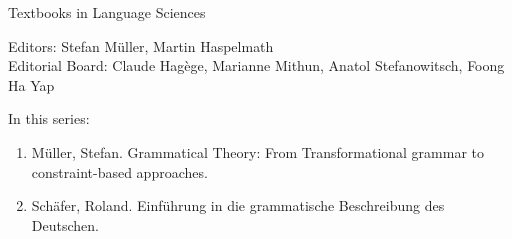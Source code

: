 {\large Textbooks in Language Sciences}

\bigskip

Editors: Stefan Müller, Martin Haspelmath  \\
Editorial Board: Claude Hagège, Marianne Mithun, Anatol Stefanowitsch, Foong Ha Yap

\bigskip

In this series:

\begin{enumerate}
\item Müller, Stefan. Grammatical Theory: From Transformational grammar to constraint-based approaches.
\item  Schäfer, Roland. Einführung in die grammatische Beschreibung des Deutschen.
\end{enumerate}



